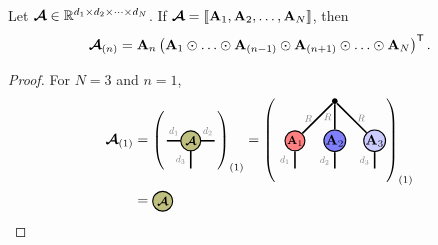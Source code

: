 \begin{proposition}
Let $\bm{\mathcal{A}}\in\mathbb{R}^{d_1\times d_2\times\dots\times d_N}$. If $\bm{\mathcal{A}}=\llbracket \mathbf{A}_1,\mathbf{A}_2,\dots,\mathbf{A}_N \rrbracket$, then 
$$\At_{(n)}=\Ab_n\left(\Ab_1\krao\dots\krao\Ab_{(n-1)}\krao\Ab_{(n+1)}\krao\dots\krao\Ab_N\right)^\ts.$$
\begin{proof}
For $N=3$ and $n=1$,
\begin{align*}
\At_{(1)}
&=
\left(\begin{tikzpicture}[baseline=\baseline]
    \tikzset{tensor/.style = {minimum size = 0.5cm,shape = circle,thick,draw=black,inner sep = 0pt}, edge/.style  = {thick,line width=.4mm},every loop/.style={}}
    \def\y{0}
    \def\x{0}
    \node[tensor,fill=green!50!red!50!white] (At) at (\x,\y){\scalebox{0.85}{$\At$}};
    \draw[edge] (\x+0.25,\y) -- (\x+0.6,\y)  node [midway,above] {\scalebox{0.7}{\dimcolor{$d_2$}}};
    \draw[edge] (\x-0.25,\y) -- (\x-0.6,\y)  node [midway,above] {\scalebox{0.7}{\dimcolor{$d_1$}}};
    \draw[edge] (\x,\y-0.25) -- (\x,\y-0.7)  node [midway,left] {\scalebox{0.7}{\dimcolor{$d_3$}}};
    \end{tikzpicture}\right)_{(1)}
=
\left(\begin{tikzpicture}[baseline=\baseline]
    \tikzset{tensor/.style = {minimum size = 0.5cm,shape = circle,thick,draw=black,inner sep = 0pt}, edge/.style   = {thick,line width=.4mm},every loop/.style={}}
    \def\y{0}
    \def\x{0}
  \node[tensor,fill=red!50!white] (A1) at (\x,\y){\scalebox{0.85}{$\Ab_1$}};
  \node[tensor,fill=blue!50!white] (A2) at (\x+1,\y){$\Ab_2$};
   \node[tensor,fill=blue!20!white] (A3) at (\x+2,\y){$\Ab_3$};
    \draw  node[fill = black,circle,inner sep=0pt,minimum size=4pt] (m) at (\x+1,\y+1) {};
    \draw[edge] (A1) -- (m) node [midway,left] {\scalebox{0.7}{\dimcolor{$R$}}};
    \draw[edge] (A2) -- (m)node [midway,left=-0.05cm] {\scalebox{0.7}{\dimcolor{$R$}}};
    \draw[edge] (A3) -- (m)node [midway,right] {\scalebox{0.7}{\dimcolor{$R$}}};
    \draw[edge](A1) -- (\x,\y-0.7)node [midway,left] {\edgelabel{$d_1$}};
    \draw[edge](A2) -- (\x+1,\y-0.7)node [midway,left] {\edgelabel{$d_2$}};
    \draw[edge](A3) -- (\x+2,\y-0.7)node [midway,left] {\edgelabel{$d_3$}};
\end{tikzpicture}\right)_{(1)}\\
&=
\begin{tikzpicture}[baseline=\baseline]
    \tikzset{tensor/.style = {minimum size = 0.5cm,shape = circle,thick,draw=black,inner sep = 0pt}, edge/.style   = {thick,line width=.4mm},every loop/.style={}}
    \def\y{0}
    \def\x{0}
    \node[tensor,fill=green!50!red!50!white] (At) at (\x,\y){\scalebox{0.85}{$\At$}};

\end{tikzpicture}
\end{align*}
\end{proof}
\end{proposition}
